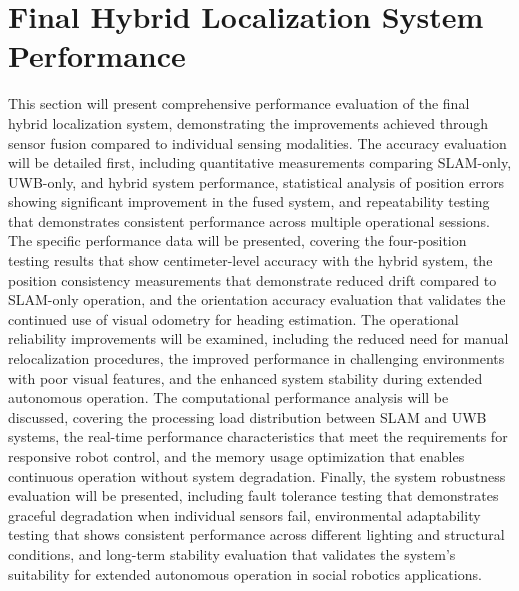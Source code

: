 \section{Final Hybrid Localization System Performance}
This section will present comprehensive performance evaluation of the final hybrid localization system, demonstrating the improvements achieved through sensor fusion compared to individual sensing modalities. The accuracy evaluation will be detailed first, including quantitative measurements comparing SLAM-only, UWB-only, and hybrid system performance, statistical analysis of position errors showing significant improvement in the fused system, and repeatability testing that demonstrates consistent performance across multiple operational sessions. The specific performance data will be presented, covering the four-position testing results that show centimeter-level accuracy with the hybrid system, the position consistency measurements that demonstrate reduced drift compared to SLAM-only operation, and the orientation accuracy evaluation that validates the continued use of visual odometry for heading estimation. The operational reliability improvements will be examined, including the reduced need for manual relocalization procedures, the improved performance in challenging environments with poor visual features, and the enhanced system stability during extended autonomous operation. The computational performance analysis will be discussed, covering the processing load distribution between SLAM and UWB systems, the real-time performance characteristics that meet the requirements for responsive robot control, and the memory usage optimization that enables continuous operation without system degradation. Finally, the system robustness evaluation will be presented, including fault tolerance testing that demonstrates graceful degradation when individual sensors fail, environmental adaptability testing that shows consistent performance across different lighting and structural conditions, and long-term stability evaluation that validates the system's suitability for extended autonomous operation in social robotics applications.
